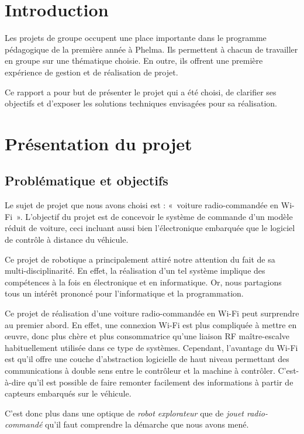 \documentclass[a4paper,12pt]{report}
\begin{document}
\chapter*{Introduction}
Les projets de groupe occupent une place importante dans le programme pédagogique de la première année à Phelma. Ils permettent à chacun de travailler en groupe sur une thématique choisie. En outre, ils offrent une première expérience de gestion et de réalisation de projet. 

Ce rapport a pour but de présenter le projet qui a été choisi, de clarifier ses objectifs et d’exposer les solutions techniques envisagées pour sa réalisation.

\tableofcontents

\chapter{Présentation du projet}


	\section{Problématique et objectifs}
	Le sujet de projet que nous avons choisi est : «~voiture radio-commandée en Wi\nobreakdash-Fi~». L’objectif du projet est de concevoir le système de commande d’un modèle réduit de voiture, ceci incluant aussi bien l’électronique embarquée que le logiciel de contrôle à distance du véhicule.

Ce projet de robotique a principalement attiré notre attention du fait de sa multi-disciplinarité. En effet, la réalisation d’un tel système implique des compétences à la fois en électronique et en informatique. Or, nous partagions tous un intérêt prononcé pour l’informatique et la programmation.

Ce projet de réalisation d’une voiture radio-commandée en Wi-Fi peut surprendre au premier abord. En effet, une connexion Wi-Fi est plus compliquée à mettre en œuvre, donc plus chère et plus consommatrice qu’une liaison RF maître-escalve habituellement utilisée dans ce type de systèmes. Cependant, l’avantage du Wi-Fi est qu’il offre une couche d’abstraction logicielle de haut niveau permettant des communications à double sens entre le contrôleur et la machine à contrôler. C’est-à-dire qu’il est possible de faire remonter facilement des informations à partir de capteurs embarqués sur le véhicule.

C’est donc plus dans une optique de \emph{robot explorateur} que de \emph{jouet radio-commandé} qu’il faut comprendre la démarche que nous avons mené.
\end{document}
